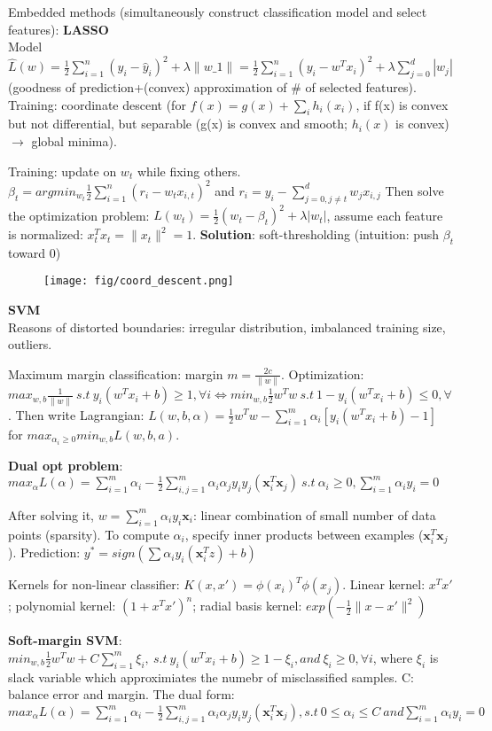 \documentclass[10pt,twocolumn]{article}
\begin{document}
Embedded methods (simultaneously construct classification model and select features): \textbf{LASSO} \\
Model $\hat{L}(w)=\frac{1}{2}\sum_{i=1}^n(y_i-\hat{y}_i)^2+\lambda\|w\_1\|=\frac{1}{2}\sum_{i=1}^n(y_i-w^Tx_i)^2+\lambda \sum_{j=0}^d|w_j|$ (goodness of prediction+(convex) approximation of \# of selected features). Training: coordinate descent (for $f(x)=g(x)+\sum_ih_i(x_i)$, if f(x) is convex but not differential, but separable (g(x) is convex and smooth; $h_i(x)$ is convex) $\rightarrow$ global minima). 

Training: update on $w_t$ while fixing others. \\
$\beta_t=argmin_{w_t}\frac{1}{2}\sum_{i=1}^n(r_i-w_tx_{i,t})^2$ and $r_i=y_i-\sum_{j=0,j\neq t}^dw_jx_{i,j}$ 
Then solve the optimization problem: $L(w_t)=\frac{1}{2}(w_t-\beta_t)^2+\lambda|w_t|$, assume each feature is normalized: $x_t^Tx_t=\|x_t\|^2=1$. \textbf{Solution}: soft-thresholding (intuition: push $\beta_t$ toward 0)
\begin{figure}[!ht]
    \centering
    \texttt{[image: fig/coord\_descent.png]}
\end{figure}

\textbf{SVM}\\
Reasons of distorted boundaries: irregular distribution, imbalanced training size, outliers. 

Maximum margin classification: margin $m=\frac{2c}{\|w\|}$. Optimization: $max_{w,b}\frac{1}{\|w\|}\ s.t\ y_i(w^Tx_i+b)\ge1,\forall i \Leftrightarrow min_{w,b}\frac{1}{2}w^Tw\ s.t\ 1-y_i(w^Tx_i+b)\le0,\forall$. Then write Lagrangian: $L(w,b,\alpha)=\frac{1}{2}w^Tw-\sum_{i=1}^m\alpha_i[y_i(w^Tx_i+b)-1]$ for $max_{\alpha_i\ge0}min_{w,b}L(w,b,a)$.

\textbf{Dual opt problem}:
$max_\alpha L(\alpha)=\sum_{i=1}^m\alpha_i-\frac{1}{2}\sum_{i,j=1}^m\alpha_i\alpha_jy_iy_j(\mathbf{x}_i^T\mathbf{x}_j)\ s.t\ \alpha_i\ge0,\sum_{i=1}^m\alpha_iy_i=0$

After solving it, $w=\sum_{i=1}^m\alpha_iy_i\mathbf{x}_i$: linear combination of small number of data points (sparsity). To compute $\alpha_i$, specify inner products between examples ($\mathbf{x}_i^T\mathbf{x}_j$). Prediction: $y^*=sign(\sum\alpha_iy_i(\mathbf{x}_i^Tz)+b)$

Kernels for non-linear classifier: $K(x,x')=\phi(x_i)^T\phi(x_j)$. Linear kernel: $x^Tx'$; polynomial kernel: $(1+x^Tx')^n$; radial basis kernel: $exp(-\frac{1}{2}\|x-x'\|^2)$

\textbf{Soft-margin SVM}: \\
$min_{w,b}\frac{1}{2}w^Tw+C\sum_{i=1}^m\xi_i,\ s.t\ y_i(w^Tx_i+b)\ge1-\xi_i, and\ \xi_i\ge0, \forall i$, where $\xi_i$ is slack variable which approximiates the numebr of misclassified samples. C: balance error and margin. The dual form: $max_\alpha L(\alpha)=\sum_{i=1}^m\alpha_i-\frac{1}{2}\sum_{i,j=1}^m\alpha_i\alpha_jy_iy_j(\mathbf{x}_i^T\mathbf{x}_j),s.t\ 0\le\alpha_i\le C\ and \sum_{i=1}^m\alpha_iy_i=0$
\end{document}
